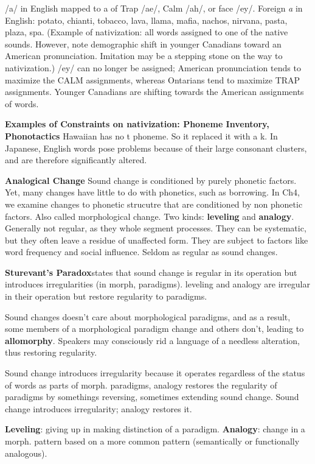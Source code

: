 \documentclass{exam}
\begin{document}
/a/ in English mapped to a of Trap /ae/, Calm /ah/, or face /ey/. Foreign \textit{a} in English: potato, chianti, tobacco, lava, llama, mafia, nachos, nirvana, pasta, plaza, spa. (Example of nativization: all words assigned to one of the native sounds. 
However, note demographic shift in younger Canadians toward an American pronunciation. 
Imitation may be a stepping stone on the way to nativization.)  
/ey/ can no longer be assigned; American pronunciation tends to maximize the CALM assignments, whereas Ontarians tend to maximize TRAP assignments. 
Younger Canadians are shifting towards the American assignments of words. 

\textbf{Examples of Constraints on nativization: Phoneme Inventory, Phonotactics} Hawaiian has no t phoneme. So it replaced it with a k. In Japanese, English words pose problems because of their large consonant clusters, and are therefore significantly altered.

\textbf{Analogical Change}  Sound change is conditioned by purely phonetic factors. Yet, many changes have little to do with phonetics, such as borrowing. In Ch4, we examine changes to phonetic strucutre that are conditioned by non phonetic factors. Also called morphological change. Two kinds: \textbf{leveling} and \textbf{analogy}. Generally not regular, as they whole segment processes. They can be systematic, but they often leave a residue of unaffected form. They are subject to factors like word frequency and social influence. Seldom as regular as sound changes. 

\textbf{Sturevant's Paradox}states that sound change is regular in its operation but introduces irregularities (in morph, paradigms). leveling and analogy are irregular in their operation but restore regularity to paradigms. 


Sound changes doesn't care about morphological paradigms, and as a result, some members of a morphological paradigm change and others don't, leading to \textbf{allomorphy}. Speakers may consciously rid a language of a needless alteration, thus restoring regularity.

Sound change introduces irregularity because it operates regardless of the status of words as parts of morph. paradigms, analogy restores the regularity of paradigms by somethings reversing, sometimes extending sound change. Sound change introduces irregularity; analogy restores it. 


\textbf{Leveling}: giving up in making distinction of a paradigm. \textbf{Analogy}: change in a morph. pattern based on a more common pattern (semantically or functionally analogous). 
\end{document}
